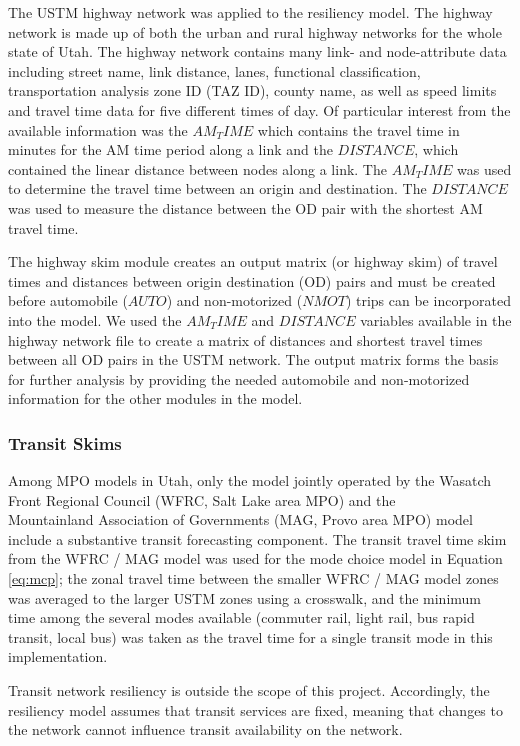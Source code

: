 The USTM highway network was applied to the resiliency model. The highway network is made up of both the urban and rural highway networks for the whole state of Utah. The highway network contains many link- and node-attribute data including street name, link distance, lanes, functional classification, transportation analysis zone ID (TAZ ID), county name, as well as speed limits and travel time data for five different times of day.  Of particular interest from the available information was the $AM_TIME$ which contains the travel time in minutes for the AM time period along a link and the $DISTANCE$, which contained the linear distance between nodes along a link. The $AM_TIME$ was used to determine the travel time between an origin and destination. The $DISTANCE$ was used to measure the distance between the OD pair with the shortest AM travel time.

The highway skim module creates an output matrix (or highway skim) of travel times and distances between origin destination (OD) pairs and must be created before automobile ($AUTO$) and non-motorized ($NMOT$) trips can be incorporated into the model. We used the $AM_TIME$ and $DISTANCE$ variables available in the highway network file to create a matrix of distances and shortest travel times between all OD pairs in the USTM network. The output matrix forms the basis for further analysis by providing the needed automobile and non-motorized information for the other modules in the model.

\subsubsection{Transit Skims}

Among MPO models in Utah, only the model jointly operated by the
Wasatch Front Regional Council (WFRC, Salt Lake area MPO) and the\\
Mountainland Association of Governments (MAG, Provo area MPO) model include a
substantive transit forecasting component. The transit travel time skim from the
WFRC / MAG model was used for the mode choice model in Equation \eqref{eq:mcp};
the zonal travel time between the smaller WFRC / MAG model zones was averaged
to the larger USTM zones using a crosswalk, and the minimum time among the several modes available
(commuter rail, light rail, bus rapid transit, local bus) was taken as the travel
time for a single transit mode in this implementation.

Transit network resiliency is outside the scope of this project. Accordingly, the resiliency
model assumes that transit services are fixed, meaning that changes to the network cannot
influence transit availability on the network.

